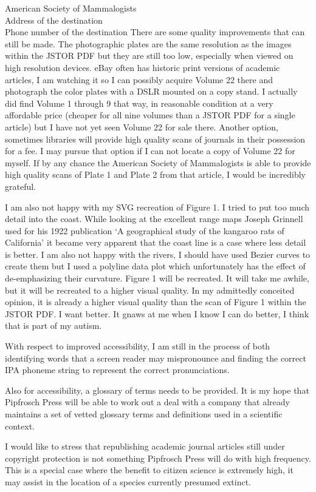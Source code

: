 \documentclass[letterpaper,11pt]{letter}
\begin{document}
\begin{letter}{American Society of Mammalogists\\Address of the destination\\Phone number of the destination}
There are some quality improvements that can still be made. The photographic plates are the same resolution as the images within the JSTOR PDF but they are still too low, especially when viewed on high resolution devices. eBay often has historic print versions of academic articles, I am watching it so I can possibly acquire Volume 22 there and photograph the color plates with a DSLR mounted on a copy stand. I actually did find Volume 1 through 9 that way, in reasonable condition at a very affordable price (cheaper for all nine volumes than a JSTOR PDF for a single article) but I have not yet seen Volume 22 for sale there. Another option, sometimes libraries will provide high quality scans of journals in their possession for a fee. I may pursue that option if I can not locate a copy of Volume 22 for myself. If by any chance the American Society of Mammalogists is able to provide high quality scans of Plate 1 and Plate 2 from that article, I would be incredibly grateful.

I am also not happy with my SVG recreation of Figure 1. I tried to put too much detail into the coast. While looking at the excellent range maps Joseph Grinnell used for his 1922 publication `A geographical study of the kangaroo rats of California' it became very apparent that the coast line is a case where less detail is better. I am also not happy with the rivers, I should have used Bezier curves to create them but I used a polyline data plot which unfortunately has the effect of de-emphasizing their curvature. Figure 1 will be recreated. It will take me awhile, but it will be recreated to a higher visual quality. In my admittedly conceited opinion, it is already a higher visual quality than the scan of Figure 1 within the JSTOR PDF. I want better. It gnaws at me when I know I can do better, I think that is part of my autism.

With respect to improved accessibility, I am still in the process of both identifying words that a screen reader may mispronounce and finding the correct IPA phoneme string to represent the correct pronunciations.

Also for accessibility, a glossary of terms needs to be provided. It is my hope that Pipfrosch Press will be able to work out a deal with a company that already maintains a set of vetted glossary terms and definitions used in a scientific context.

I would like to stress that republishing academic journal articles still under copyright protection is not something Pipfrosch Press will do with high frequency. This is a special case where the benefit to citizen science is extremely high, it may assist in the location of a species currently presumed extinct.


\end{letter}
\end{document}
